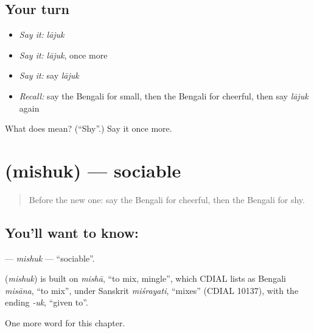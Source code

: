 \subsection*{Your turn}
\begin{itemize}
\raggedright
  \item \emph{Say it:} \emph{lājuk}
  \item \emph{Say it:} \emph{lājuk}, once more
  \item \emph{Say it:} say \emph{lājuk}
  \item \emph{Recall:} say the Bengali for small, then the Bengali for cheerful, then say \emph{lājuk} again
\end{itemize}

\begin{tcolorbox}[breakable,colback=teal!4,colframe=teal!35!black,title={Before you move on}]
What does  mean? (\textquotedblleft{}Shy\textquotedblright{}.) Say it once more.
\end{tcolorbox}
\section[\texorpdfstring{\bn{মিশুক} (mishuk)}{মিশুক (mishuk)}]{ (mishuk) — sociable}

\label{lesson:BN-C144-mishuk}



\begin{quote}
Before the new one: say the Bengali for cheerful, then the Bengali for shy.
\end{quote}

\subsection*{You'll want to know: }
\textbf{} — \emph{mishuk} — \textquotedblleft{}sociable\textquotedblright{}.

\begin{cousinweb}
\textbf{} (\emph{mishuk}) is built on \emph{mishā}, \textquotedblleft{}to mix, mingle\textquotedblright{}, which CDIAL lists as Bengali \emph{misāna}, \textquotedblleft{}to mix\textquotedblright{}, under Sanskrit \emph{miśrayati}, \textquotedblleft{}mixes\textquotedblright{} (CDIAL 10137), with the ending \emph{-uk}, \textquotedblleft{}given to\textquotedblright{}.
\end{cousinweb}

\begin{grammarlens}[title={What you've built}]
One more word for this chapter.
\end{grammarlens}

